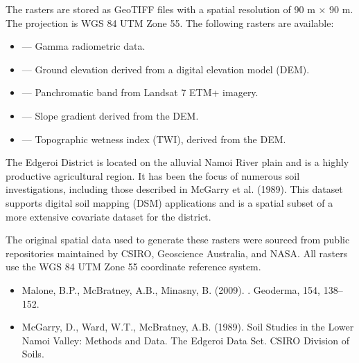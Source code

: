 \documentclass[a4paper]{book}
\begin{document}
%
\begin{Format}
The rasters are stored as GeoTIFF files with a spatial resolution of 90 m × 90 m. The projection is WGS 84 UTM Zone 55. The following rasters are available:
\begin{itemize}

\item{}  — Gamma radiometric data.
\item{}  — Ground elevation derived from a digital elevation model (DEM).
\item{}  — Panchromatic band from Landsat 7 ETM+ imagery.
\item{}  — Slope gradient derived from the DEM.
\item{}  — Topographic wetness index (TWI), derived from the DEM.

\end{itemize}

\end{Format}
%
\begin{Details}
The Edgeroi District is located on the alluvial Namoi River plain and is a highly productive agricultural region. It has been the focus of numerous soil investigations, including those described in McGarry et al. (1989). This dataset supports digital soil mapping (DSM) applications and is a spatial subset of a more extensive covariate dataset for the district.
\end{Details}
%
\begin{Note}
The original spatial data used to generate these rasters were sourced from public repositories maintained by CSIRO, Geoscience Australia, and NASA. All rasters use the WGS 84 UTM Zone 55 coordinate reference system.
\end{Note}
%
\begin{References}
\begin{itemize}

\item{} Malone, B.P., McBratney, A.B., Minasny, B. (2009). . Geoderma, 154, 138–152.
\item{} McGarry, D., Ward, W.T., McBratney, A.B. (1989). Soil Studies in the Lower Namoi Valley: Methods and Data. The Edgeroi Data Set. CSIRO Division of Soils.

\end{itemize}

\end{References}
\end{document}
